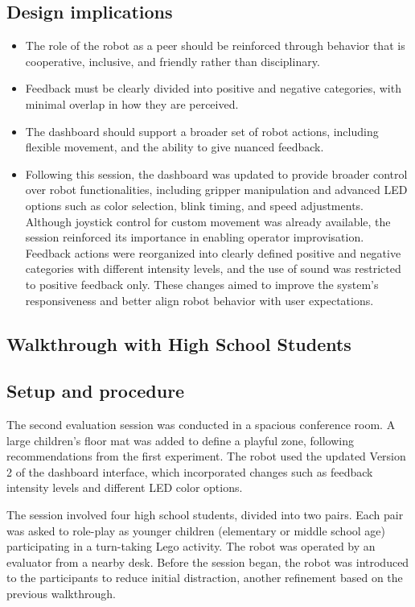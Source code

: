 \documentclass[a4paper]{usiinfbachelorproject}
\begin{document}
\subsection*{\textbf{Design implications}}
\begin{itemize}
    \item The role of the robot as a peer should be reinforced through behavior that is cooperative, inclusive, and friendly rather than disciplinary.
    \item Feedback must be clearly divided into positive and negative categories, with minimal overlap in how they are perceived.
    \item The dashboard should support a broader set of robot actions, including flexible movement, and the ability to give nuanced feedback.
    \item Following this session, the dashboard was updated to provide broader control over robot functionalities, including gripper manipulation and advanced LED options such as color selection, blink timing, and speed adjustments.
          Although joystick control for custom movement was already available, the session reinforced its importance in enabling operator improvisation.
          Feedback actions were reorganized into clearly defined positive and negative categories with different intensity levels, and the use of sound was restricted to positive feedback only.
          These changes aimed to improve the system's responsiveness and better align robot behavior with user expectations.
\end{itemize}

\subsection{\textbf{Walkthrough with High School Students}}\label{sec:high-school-walkthrough}
\subsection*{\textbf{Setup and procedure}}
The second evaluation session was conducted in a spacious conference room.
A large children's floor mat was added to define a playful zone, following recommendations from the first experiment.
The robot used the updated Version 2 of the dashboard interface, which incorporated changes such as feedback intensity levels and different LED color options.

The session involved four high school students, divided into two pairs.
Each pair was asked to role-play as younger children (elementary or middle school age) participating in a turn-taking Lego activity.
The robot was operated by an evaluator from a nearby desk.
Before the session began, the robot was introduced to the participants to reduce initial distraction, another refinement based on the previous walkthrough.
\end{document}
